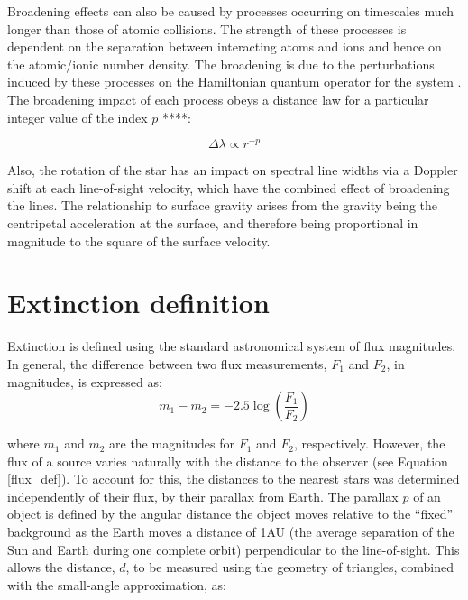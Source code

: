 \documentclass[12pt, a4paper]{report}
\begin{document}
Broadening effects can also be caused by processes occurring on timescales much longer than those of atomic collisions. The strength of these processes is dependent on the separation between interacting atoms and ions and hence on the atomic/ionic number density. The broadening is due to the perturbations induced by these processes on the Hamiltonian quantum operator for the system \citep{1929ApJ....69..173S}. The broadening impact of each process obeys a distance law for a particular integer value of the index $p$ \citep{Peach_1984}****:

\begin{equation}
\Delta \lambda \propto r^{-p}
\label{broadening_dist}
\end{equation} 

Also, the rotation of the star has an impact on spectral line widths via a Doppler shift at each line-of-sight velocity, which have the combined effect of broadening the lines. The relationship to surface gravity arises from the gravity being the centripetal acceleration at the surface, and therefore being proportional in magnitude to the square of the surface velocity.

\section{Extinction definition} \label{extinc_desc}
Extinction is defined using the standard astronomical system of flux magnitudes. In general, the difference between two flux measurements, $F_{1}$ and $F_{2}$, in magnitudes, is expressed as:
\begin{equation}
\label{mags_def}
m_{1} - m_{2} = -2.5\log \left( \frac{F_{1}}{F_{2}} \right)
\end{equation}

where $m_{1}$ and $m_{2}$ are the magnitudes for $F_{1}$ and $F_{2}$, respectively. However, the flux of a source varies naturally with the distance to the observer (see Equation \ref{flux_def}). To account for this, the distances to the nearest stars was determined independently of their flux, by their parallax from Earth. The parallax $p$ of an object is defined by the angular distance the object moves relative to the ``fixed'' background as the Earth moves a distance of 1AU (the average separation of the Sun and Earth during one complete orbit) perpendicular to the line-of-sight. This allows the distance, $d$, to be measured using the geometry of triangles, combined with the small-angle approximation, as:
\end{document}
